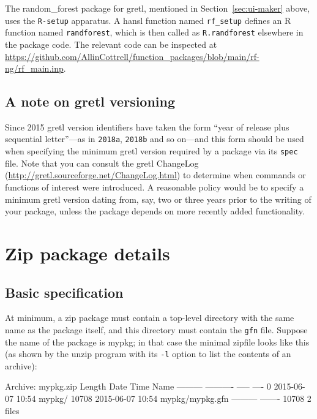 \documentclass[oneside]{book}
\begin{document}
\begin{description}
The \textsf{random\_forest} package for gretl, mentioned in
Section~\ref{sec:ui-maker} above, uses the \texttt{R-setup} apparatus.
A hansl function named \texttt{rf\_setup} defines an \textsf{R}
function named \texttt{randforest}, which is then called as
\texttt{R.randforest} elsewhere in the package code. The relevant code
can be inspected at
\url{https://github.com/AllinCottrell/function_packages/blob/main/rf-ng/rf_main.inp}.

\end{description}

\section{A note on gretl versioning}
\label{sec:versioning}

Since 2015 gretl version identifiers have taken the form ``year of
release plus sequential letter''---as in \texttt{2018a},
\texttt{2018b} and so on---and this form should be used when
specifying the minimum gretl version required by a package via its
\texttt{spec} file. Note that you can consult the gretl ChangeLog
(\url{http://gretl.sourceforge.net/ChangeLog.html}) to determine when
commands or functions of interest were introduced. A reasonable policy
would be to specify a minimum gretl version dating from, say, two or
three years prior to the writing of your package, unless the package
depends on more recently added functionality.

\chapter{Zip package details}
\label{chap:zipfile}

\section{Basic specification}

At minimum, a zip package must contain a top-level directory with the
same name as the package itself, and this directory must contain the
\texttt{gfn} file. Suppose the name of the package is \textsf{mypkg};
in that case the minimal zipfile looks like this (as shown by the
\textsf{unzip} program with its \texttt{-l} option to list the
contents of an archive):

\begin{code}
Archive:  mypkg.zip
  Length      Date    Time    Name
---------  ---------- -----   ----
        0  2015-06-07 10:54   mypkg/
    10708  2015-06-07 10:54   mypkg/mypkg.gfn
---------                     -------
    10708                     2 files
\end{code}
\end{document}
